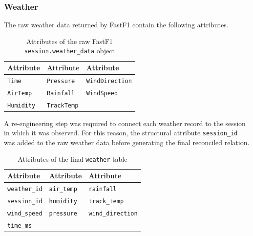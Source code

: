 \documentclass[12pt,a4paper]{article}
\begin{document}
	\subsubsection{Weather}
	
	The raw weather data returned by FastF1 contain the following attributes.
	
	\begin{table}[H]
		\centering
		\caption{Attributes of the raw FastF1 \texttt{session.weather\_data} object}
		\renewcommand{\arraystretch}{1.15}
		\begin{tabularx}{0.95\textwidth}{>{\raggedright\arraybackslash}X >{\raggedright\arraybackslash}X >{\raggedright\arraybackslash}X}
			\toprule
			\textbf{Attribute} & \textbf{Attribute} & \textbf{Attribute} \\
			\midrule
			\texttt{Time} & \texttt{Pressure} & \texttt{WindDirection} \\
			\texttt{AirTemp} & \texttt{Rainfall} & \texttt{WindSpeed} \\
			\texttt{Humidity} & \texttt{TrackTemp} & \\
			\bottomrule
		\end{tabularx}
	\end{table}
	
	A re-engineering step was required to connect each weather record to the session in which it was observed.
	For this reason, the structural attribute \texttt{session\_id} was added to the raw weather data before generating the final reconciled relation.
	
	\begin{table}[H]
		\centering
		\caption{Attributes of the final \texttt{weather} table}
		\renewcommand{\arraystretch}{1.15}
		\begin{tabularx}{0.95\textwidth}{>{\raggedright\arraybackslash}X >{\raggedright\arraybackslash}X >{\raggedright\arraybackslash}X}
			\toprule
			\textbf{Attribute} & \textbf{Attribute} & \textbf{Attribute} \\
			\midrule
			\texttt{weather\_id}   & \texttt{air\_temp}       & \texttt{rainfall} \\
			\texttt{session\_id}  & \texttt{humidity}        & \texttt{track\_temp} \\
			\texttt{wind\_speed}  & \texttt{pressure}        & \texttt{wind\_direction} \\
			\texttt{time\_ms}       &     & \\
			\bottomrule
		\end{tabularx}
	\end{table}
	
\end{document}
